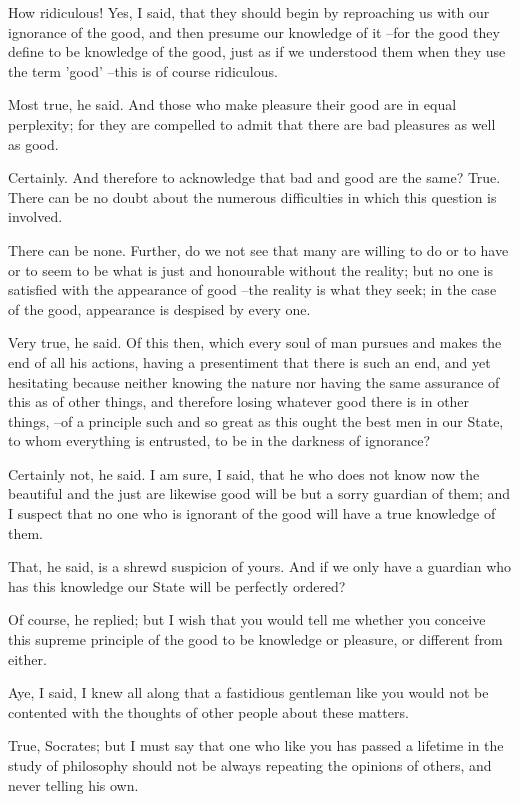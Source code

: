 How ridiculous!
Yes, I said, that they should begin by reproaching us with our ignorance of the good, and then presume our knowledge of it --for the good they define to be knowledge of the good, just as if we understood them when they use the term 'good' --this is of course ridiculous.

Most true, he said.
And those who make pleasure their good are in equal perplexity; for they are compelled to admit that there are bad pleasures as well as good.

Certainly.
And therefore to acknowledge that bad and good are the same?
True.
There can be no doubt about the numerous difficulties in which this question is involved.

There can be none.
Further, do we not see that many are willing to do or to have or to seem to be what is just and honourable without the reality; but no one is satisfied with the appearance of good --the reality is what they seek; in the case of the good, appearance is despised by every one.

Very true, he said.
Of this then, which every soul of man pursues and makes the end of all his actions, having a presentiment that there is such an end, and yet hesitating because neither knowing the nature nor having the same assurance of this as of other things, and therefore losing whatever good there is in other things, --of a principle such and so great as this ought the best men in our State, to whom everything is entrusted, to be in the darkness of ignorance?

Certainly not, he said.
I am sure, I said, that he who does not know now the beautiful and the just are likewise good will be but a sorry guardian of them; and I suspect that no one who is ignorant of the good will have a true knowledge of them.

That, he said, is a shrewd suspicion of yours.
And if we only have a guardian who has this knowledge our State will be perfectly ordered?

Of course, he replied; but I wish that you would tell me whether you conceive this supreme principle of the good to be knowledge or pleasure, or different from either.

Aye, I said, I knew all along that a fastidious gentleman like you would not be contented with the thoughts of other people about these matters.

True, Socrates; but I must say that one who like you has passed a lifetime in the study of philosophy should not be always repeating the opinions of others, and never telling his own.

